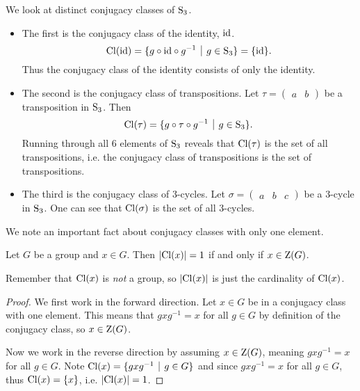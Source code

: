 \begin{example}\label{example-conjugacy-classes-of-Sn3}
    We look at distinct conjugacy classes of $\mathrm{S}_{3}$.
    \begin{itemize}
        \item The first is the conjugacy class of the identity, $\mathrm{id}$.
        \[
            \Cl{\id} = \{g\circ\id\circ g^{-1} \vert g \in \Sn{3} \} = \{\id\}.
        \]
        Thus the conjugacy class of the identity consists of only the identity.
        \item The second is the conjugacy class of transpositions. Let $\tau = \begin{pmatrix}a & b\end{pmatrix}$ be a transposition in $\mathrm{S}_{3}$. Then
        \[
            \Cl{\tau} = \{g\circ\tau\circ g^{-1} \vert g \in \Sn{3}\}.
        \]
        Running through all 6 elements of $\mathrm{S}_{3}$ reveals that $\mathrm{Cl}(\tau)$ is the set of all transpositions, i.e. the conjugacy class of transpositions is the set of transpositions.
        \item The third is the conjugacy class of 3-cycles. Let $\sigma = \begin{pmatrix}a & b & c\end{pmatrix}$ be a 3-cycle in $\mathrm{S}_{3}$. One can see that $\mathrm{Cl}(\sigma)$ is the set of all 3-cycles.
    \end{itemize}
\end{example}

We note an important fact about conjugacy classes with only one element.
\begin{proposition}\label{prop-element-with-singleton-conjugacy-class-in-center}
    Let $G$ be a group and $x \in G$. Then $|\mathrm{Cl}(x)| = 1$ if and only if $x \in \mathrm{Z}(G)$.
\end{proposition}
\begin{remark}
    Remember that $\mathrm{Cl}(x)$ is \textit{not} a group, so $|\mathrm{Cl}(x)|$ is just the cardinality of $\mathrm{Cl}(x)$.
\end{remark}
\begin{proof}
    We first work in the forward direction. Let $x \in G$ be in a conjugacy class with one element. This means that $gxg^{-1} = x$ for all $g \in G$ by definition of the conjugacy class, so $x \in \mathrm{Z}(G)$.

    Now we work in the reverse direction by assuming $x \in \mathrm{Z}(G)$, meaning $gxg^{-1} = x$ for all $g \in G$. Note $\Cl{x} = \{gxg^{-1} \vert g \in G\}$ and since $gxg^{-1} = x$ for all $g \in G$, thus $\mathrm{Cl}(x) = \{x\}$, i.e. $|\mathrm{Cl}(x)| = 1$.
\end{proof}

